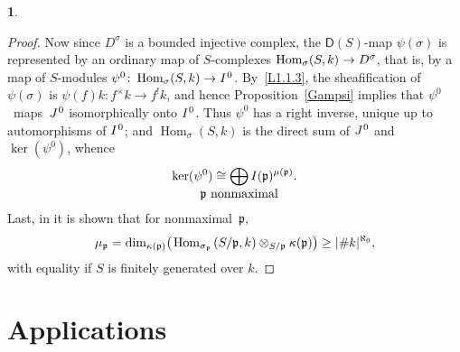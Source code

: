 \documentclass{compositio}
\theoremstyle{plain}
\theoremstyle{definition}
\newtheorem{cosa}[thm]{}
\theoremstyle{remark}
\numberwithin{equation}{thm}
\begin{document}
\begin{cosa}
\begin{proof}
Now since $D^\sigma$ is a bounded injective complex, the ${\boldsymbol{\mathsf{D}}}(S)$-map
$\psi(\sigma)$ is represented by an ordinary map of $S$-complexes 
$\operatorname{Hom}_{\sigma}(S,k)\to D^\sigma{\mkern-1mu}$, that is, by a map of $S$-modules
$\psi^0\colon \operatorname{Hom}_{\sigma}(S,k)\to I{\mkern1mu}^0$.  By~\ref{L1.1.3}, the sheafification 
of~$\psi(\sigma)$ is 
$\psi(f)k\colon f^\times k\to f^!k$, and hence Proposition~\ref{Gampsi} implies that  $\psi^0$~maps~$J{\mkern1mu}^0$ isomorphically onto $I{\mkern1mu}^0$. Thus $\psi^0$ has a right inverse, unique up to
automorphisms of $I{\mkern1mu}^0$; and $\operatorname{Hom}_{\sigma}(S,k)$ is the direct sum of $J{\mkern1mu}^0$ and~ 
$\ker(\psi^0)$, whence
\[
\ker(\psi^0)\cong \bigoplus_{\makebox[7pt]{${\scriptstyle} {{\mathfrak p}}\textup{ nonmaximal}$}}I({{\mathfrak p}})^{\mu({{\mathfrak p}})}.
\]
\vskip2pt
\noindent Last, in \cite[Theorem 1.11]{Nm3} it is shown that for nonmaximal~${{\mathfrak p}}$,
\[
\mu_{{\mathfrak p}}=\dim_{\kappa({{\mathfrak p}})}\!\big({\mkern-1mu} \operatorname{Hom}_{\sigma_{{\mathfrak p}}}{\mkern-1mu}(S/{{\mathfrak p}},k)\otimes_{S/{{\mathfrak p}}}\kappa({{\mathfrak p}})\big)\ge|\#k|^{\aleph_0}, 
\]
with equality if $S$ is finitely generated over $k$. 
\end{proof}
\end{cosa}

\section{Applications}
\end{document}
